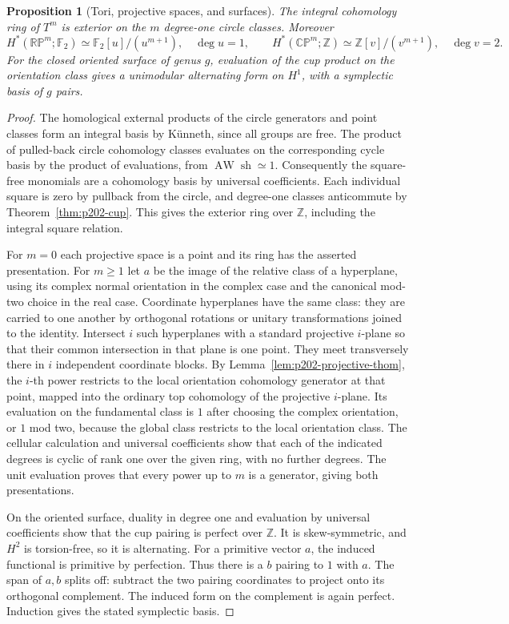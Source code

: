 \documentclass[11pt,oneside,openany]{book}
\theoremstyle{plain}
\newtheorem{proposition}[theorem]{Proposition}
\theoremstyle{definition}
\theoremstyle{remark}
\begin{document}
\begin{proposition}[Tori, projective spaces, and surfaces]
\label{prop:p202-cohomology-rings}
The integral cohomology ring of \(T^m\) is exterior on the
\(m\) degree-one circle classes. Moreover
\[
 H^*(\mathbb{RP}^m;\mathbb F_2)
       \simeq \mathbb F_2[u]/(u^{m+1}),\quad \deg u=1,
 \qquad
 H^*(\mathbb{CP}^m;\mathbb Z)
       \simeq \mathbb Z[v]/(v^{m+1}),\quad \deg v=2 .
\]
For the closed oriented surface of genus \(g\), evaluation
of the cup product on the orientation class gives a
unimodular alternating form on \(H^1\), with a symplectic
basis of \(g\) pairs.
\end{proposition}
\begin{proof}
The homological external products of the circle
generators and point classes form an integral basis
by K\"unneth, since all groups are free. The product
of pulled-back circle cohomology classes evaluates
on the corresponding cycle basis by the product of
evaluations, from
\(\operatorname{AW}\operatorname{sh}\simeq1\).
Consequently the square-free monomials are a cohomology
basis by universal coefficients. Each individual square
is zero by pullback from the circle, and degree-one
classes anticommute by Theorem~\ref{thm:p202-cup}.
This gives the exterior ring over \(\mathbb Z\), including
the integral square relation.

For \(m=0\) each projective space is a point and its ring
has the asserted presentation. For \(m\geq1\) let \(a\)
be the image of the
relative class of a hyperplane, using its complex normal
orientation in the complex case and the canonical mod-two
choice in the real case. Coordinate hyperplanes have
the same class: they are carried to one another by
orthogonal rotations or unitary transformations joined
to the identity. Intersect \(i\) such hyperplanes with
a standard projective \(i\)-plane so that their common
intersection in that plane is one point. They meet
transversely there in \(i\) independent coordinate blocks.
By Lemma~\ref{lem:p202-projective-thom}, the \(i\)-th
power restricts to the local orientation cohomology
generator at that point, mapped into the ordinary
top cohomology of the projective \(i\)-plane.
Its evaluation on the fundamental class is \(1\) after
choosing the complex orientation, or \(1\) mod two,
because the global class restricts to the local
orientation class. The cellular calculation and universal
coefficients show that each of the indicated degrees is
cyclic of rank one over the given ring, with no further
degrees. The unit evaluation proves that every power up
to \(m\) is a generator, giving both presentations.

On the oriented surface, duality in degree one and
evaluation by universal coefficients show that the
cup pairing is perfect over \(\mathbb Z\). It is
skew-symmetric, and \(H^2\) is torsion-free, so it is
alternating. For a primitive vector \(a\), the induced
functional is primitive by perfection. Thus there is
a \(b\) pairing to \(1\) with \(a\). The span of
\(a,b\) splits off: subtract the two pairing coordinates
to project onto its orthogonal complement. The induced
form on the complement is again perfect. Induction
gives the stated symplectic basis.
\end{proof}
\end{document}
